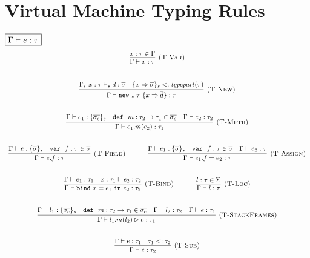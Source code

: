 \documentclass{article}
\newcommand{\keywadj}[1]{\mathtt{#1}}
\newcommand{\keyw}[1]{\keywadj{#1}~}
\begin{document}
\section{Virtual Machine Typing Rules}

$\fbox{$\Gamma \vdash e : \tau$}$
\[
\begin{array}{c}
\infer[\textsc{(T-Var)}]
  {\Gamma \vdash x : \tau}
  {x : \tau \in \Gamma}\\[5ex]

\infer[\textsc{(T-New)}]
	{\Gamma \vdash \keyw{new}_s~\tau~\{x \Rightarrow \overline{d}\} : \tau}
	{\Gamma,~ x : \tau \vdash_s \overline{d} : \overline{\sigma} & \{ x \Rightarrow \overline{\sigma}\}_s <: \mathit{typepart}(\tau)} \\[5ex]

	
\infer[\textsc{(T-Meth)}]
	{\Gamma \vdash e_1.m(e_2) : \tau_1} 
	{\Gamma \vdash e_1 : \{ \overline{\sigma_e} \}_s  & \keyw{def}~ m : \tau_2 \rightarrow \tau_1 \in \overline{\sigma_e} & \Gamma \vdash e_2 : \tau_2}\\[5ex]

\infer[\textsc{(T-Field)}]
	{\Gamma \vdash  e.f : \tau} 
	{\Gamma \vdash e : \{ \overline{\sigma} \}_s & \keyw{var}~ f : \tau \in \overline{\sigma}}%
~~~~~~~~~~
\infer[\textsc{(T-Assign)}]
	{\Gamma \vdash  e_1.f=e_2 : \tau} 
	{\Gamma \vdash e_1 : \{ \overline{\sigma} \}_s & \keyw{var}~ f : \tau \in \overline{\sigma} & \Gamma \vdash e_2 : \tau}\\[5ex]

\infer[\textsc{(T-Bind)}]
  {\Gamma \vdash \keyw{bind} x = e_1~\keyw{in} e_2 : \tau_2}
  {\Gamma \vdash e_1 : \tau_1 & x : \tau_1 \vdash e_2 : \tau_2}%
~~~~~~~~~~
\infer[\textsc{(T-Loc)}]
  {\Gamma \vdash l : \tau}
  {l : \tau \in \Sigma}\\[5ex]

\infer[\textsc{(T-StackFrames)}]
	{\Gamma \vdash l_1.m(l_2) \rhd e : \tau_1}
	{\Gamma \vdash l_1 : \{ \overline{\sigma_e} \}_s & \keyw{def}~ m : \tau_2 \rightarrow \tau_1 \in \overline{\sigma_e} & \Gamma \vdash l_2 : \tau_2 & \Gamma \vdash e : \tau_1} \\[5ex]

\infer[\textsc{(T-Sub)}]
  {\Gamma \vdash e : \tau_2}
  {\Gamma \vdash e : \tau_1 & \tau_1 <: \tau_2}\\[5ex]

\end{array}
\]
\end{document}
